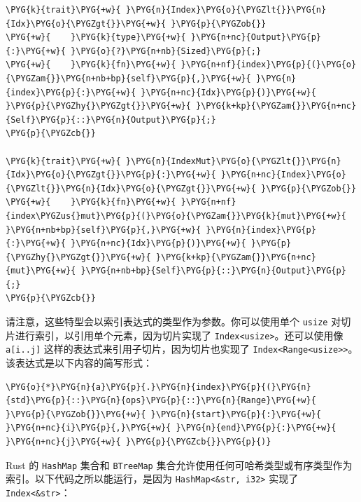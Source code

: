 \begin{Verbatim}[commandchars=\\\{\},breaklines=true,breakanywhere=true,fontsize=\codefont,xleftmargin=17bp]
\PYG{k}{trait}\PYG{+w}{ }\PYG{n}{Index}\PYG{o}{\PYGZlt{}}\PYG{n}{Idx}\PYG{o}{\PYGZgt{}}\PYG{+w}{ }\PYG{p}{\PYGZob{}}
\PYG{+w}{    }\PYG{k}{type}\PYG{+w}{ }\PYG{n+nc}{Output}\PYG{p}{:}\PYG{+w}{ }\PYG{o}{?}\PYG{n+nb}{Sized}\PYG{p}{;}
\PYG{+w}{    }\PYG{k}{fn}\PYG{+w}{ }\PYG{n+nf}{index}\PYG{p}{(}\PYG{o}{\PYGZam{}}\PYG{n+nb+bp}{self}\PYG{p}{,}\PYG{+w}{ }\PYG{n}{index}\PYG{p}{:}\PYG{+w}{ }\PYG{n+nc}{Idx}\PYG{p}{)}\PYG{+w}{ }\PYG{p}{\PYGZhy{}\PYGZgt{}}\PYG{+w}{ }\PYG{k+kp}{\PYGZam{}}\PYG{n+nc}{Self}\PYG{p}{::}\PYG{n}{Output}\PYG{p}{;}
\PYG{p}{\PYGZcb{}}

\PYG{k}{trait}\PYG{+w}{ }\PYG{n}{IndexMut}\PYG{o}{\PYGZlt{}}\PYG{n}{Idx}\PYG{o}{\PYGZgt{}}\PYG{p}{:}\PYG{+w}{ }\PYG{n+nc}{Index}\PYG{o}{\PYGZlt{}}\PYG{n}{Idx}\PYG{o}{\PYGZgt{}}\PYG{+w}{ }\PYG{p}{\PYGZob{}}
\PYG{+w}{    }\PYG{k}{fn}\PYG{+w}{ }\PYG{n+nf}{index\PYGZus{}mut}\PYG{p}{(}\PYG{o}{\PYGZam{}}\PYG{k}{mut}\PYG{+w}{ }\PYG{n+nb+bp}{self}\PYG{p}{,}\PYG{+w}{ }\PYG{n}{index}\PYG{p}{:}\PYG{+w}{ }\PYG{n+nc}{Idx}\PYG{p}{)}\PYG{+w}{ }\PYG{p}{\PYGZhy{}\PYGZgt{}}\PYG{+w}{ }\PYG{k+kp}{\PYGZam{}}\PYG{n+nc}{mut}\PYG{+w}{ }\PYG{n+nb+bp}{Self}\PYG{p}{::}\PYG{n}{Output}\PYG{p}{;}
\PYG{p}{\PYGZcb{}}
\end{Verbatim}

请注意，这些特型会以索引表达式的类型作为参数。你可以使用单个 \texttt{usize} 对切片进行索引，以引用单个元素，因为切片实现了 \texttt{Index<usize>}。还可以使用像 \texttt{a[i..j]} 这样的表达式来引用子切片，因为切片也实现了 \texttt{Index<Range<usize>>}。该表达式是以下内容的简写形式：

\begin{Verbatim}[commandchars=\\\{\},breaklines=true,breakanywhere=true,fontsize=\codefont,xleftmargin=17bp]
\PYG{o}{*}\PYG{n}{a}\PYG{p}{.}\PYG{n}{index}\PYG{p}{(}\PYG{n}{std}\PYG{p}{::}\PYG{n}{ops}\PYG{p}{::}\PYG{n}{Range}\PYG{+w}{ }\PYG{p}{\PYGZob{}}\PYG{+w}{ }\PYG{n}{start}\PYG{p}{:}\PYG{+w}{ }\PYG{n+nc}{i}\PYG{p}{,}\PYG{+w}{ }\PYG{n}{end}\PYG{p}{:}\PYG{+w}{ }\PYG{n+nc}{j}\PYG{+w}{ }\PYG{p}{\PYGZcb{}}\PYG{p}{)}
\end{Verbatim}

Rust 的 \texttt{HashMap} 集合和 \texttt{BTreeMap} 集合允许使用任何可哈希类型或有序类型作为索引。以下代码之所以能运行，是因为 \texttt{HashMap<\&str, i32>} 实现了 \texttt{Index<\&str>}：

